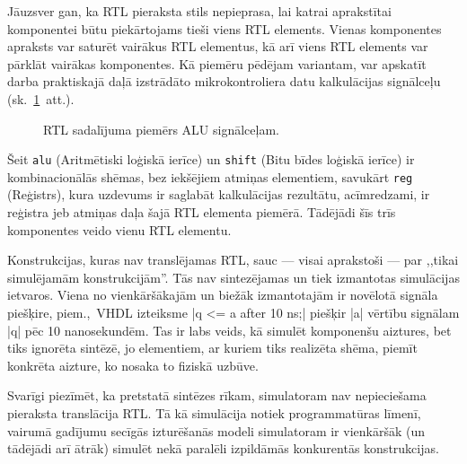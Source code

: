 Jāuzsver gan, ka RTL pieraksta stils nepieprasa, lai katrai aprakstītai
komponentei būtu piekārtojams tieši viens RTL elements. Vienas komponentes
apraksts var saturēt vairākus RTL elementus, kā arī viens RTL elements var
pārklāt vairākas komponentes. Kā piemēru pēdējam variantam, var apskatīt
darba praktiskajā daļā izstrādāto mikrokontroliera datu kalkulācijas
signālceļu (sk.~\ref{fig:rtl-alu}~att.).
\begin{figure}[thb]
	\centering
	\def\svgwidth{0.9\textwidth}
	{\ttfamily\scriptsize}
	\caption{RTL sadalījuma piemērs ALU signālceļam.}
	\label{fig:rtl-alu}
\end{figure}
Šeit \texttt{alu} (Aritmētiski loģiskā ierīce) un \texttt{shift}
(Bitu bīdes loģiskā ierīce) ir kombinacionālās shēmas, bez iekšējiem atmiņas
elementiem, savukārt \texttt{reg} (Reģistrs), kura uzdevums ir saglabāt kalkulācijas
rezultātu, acīmredzami, ir reģistra jeb atmiņas daļa šajā RTL elementa piemērā.
Tādējādi šīs trīs komponentes veido vienu RTL elementu.

Konstrukcijas, kuras nav translējamas RTL, sauc --- visai aprakstoši --- par 
,,tikai simulējamām konstrukcijām''. Tās nav sintezējamas un tiek
izmantotas simulācijas ietvaros. Viena no vienkāršākajām un biežāk
izmantotajām ir novēlotā signāla piešķire, piem.,~VHDL izteiksme 
|q <= a after 10 ns;| piešķir |a| vērtību signālam |q| pēc 10 nanosekundēm.
Tas ir labs veids, kā simulēt komponenšu aiztures, bet tiks ignorēta
sintēzē, jo elementiem, ar kuriem tiks realizēta shēma, piemīt
konkrēta aizture, ko nosaka to fiziskā uzbūve.

Svarīgi piezīmēt, ka pretstatā sintēzes rīkam, simulatoram nav nepieciešama
pieraksta translācija RTL. Tā kā simulācija notiek
programmatūras līmenī, vairumā gadījumu secīgās izturēšanās modeli
simulatoram ir vienkāršāk (un tādējādi arī ātrāk) simulēt nekā paralēli
izpildāmās konkurentās konstrukcijas.
